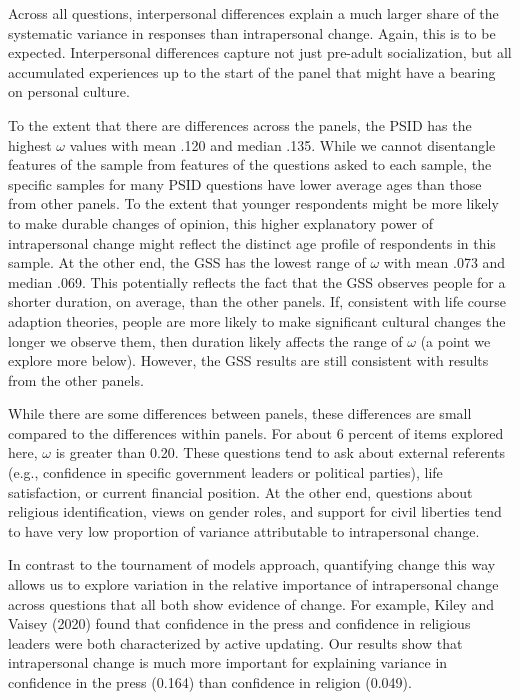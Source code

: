 \documentclass[
  12pt,
]{article}
\begin{document}
Across all questions, interpersonal differences explain a much larger
share of the systematic variance in responses than intrapersonal change.
Again, this is to be expected. Interpersonal differences capture not
just pre-adult socialization, but all accumulated experiences up to the
start of the panel that might have a bearing on personal culture.

To the extent that there are differences across the panels, the PSID has
the highest \(\omega\) values with mean .120 and median .135. While we
cannot disentangle features of the sample from features of the questions
asked to each sample, the specific samples for many PSID questions have
lower average ages than those from other panels. To the extent that
younger respondents might be more likely to make durable changes of
opinion, this higher explanatory power of intrapersonal change might
reflect the distinct age profile of respondents in this sample. At the
other end, the GSS has the lowest range of \(\omega\) with mean .073 and
median .069. This potentially reflects the fact that the GSS observes
people for a shorter duration, on average, than the other panels. If,
consistent with life course adaption theories, people are more likely to
make significant cultural changes the longer we observe them, then
duration likely affects the range of \(\omega\) (a point we explore more
below). However, the GSS results are still consistent with results from
the other panels.

While there are some differences between panels, these differences are
small compared to the differences within panels. For about 6 percent of
items explored here, \(\omega\) is greater than 0.20. These questions
tend to ask about external referents (e.g., confidence in specific
government leaders or political parties), life satisfaction, or current
financial position. At the other end, questions about religious
identification, views on gender roles, and support for civil liberties
tend to have very low proportion of variance attributable to
intrapersonal change.

In contrast to the tournament of models approach, quantifying change
this way allows us to explore variation in the relative importance of
intrapersonal change across questions that all both show evidence of
change. For example, Kiley and Vaisey (2020) found that confidence in
the press and confidence in religious leaders were both characterized by
active updating. Our results show that intrapersonal change is much more
important for explaining variance in confidence in the press (0.164)
than confidence in religion (0.049).
\end{document}
